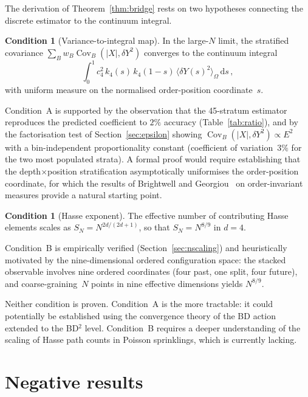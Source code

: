 \documentclass[12pt,a4paper]{article}
\theoremstyle{plain}
\theoremstyle{definition}
\newtheorem{condition}[theorem]{Condition}
\theoremstyle{remark}
\newcommand{\dd}{\mathrm{d}}
\newcommand{\Cov}{\operatorname{Cov}}
\begin{document}
The derivation of Theorem~\ref{thm:bridge} rests on two hypotheses
connecting the discrete estimator to the continuum integral.

\begin{condition}[Variance-to-integral map]
\label{cond:A}
In the large-$N$ limit, the stratified covariance
$\sum_B w_B \Cov_B(|X|, \delta Y^2)$ converges to the continuum
integral
\begin{equation}\label{eq:condA}
  \int_0^1 c_4^2\, k_4(s)\, k_4(1-s)\,
  \langle \delta Y(s)^2 \rangle_\Omega\, \dd s\,,
\end{equation}
with uniform measure on the normalised order-position
coordinate~$s$.
\end{condition}

Condition~A is supported by the observation that the 45-stratum
estimator reproduces the predicted coefficient to $2\%$ accuracy
(Table~\ref{tab:ratio}), and by the factorisation test of
Section~\ref{sec:epsilon} showing
$\Cov_B(|X|, \delta Y^2) \propto E^2$ with a bin-independent
proportionality constant (coefficient of variation~$3\%$ for the
two most populated strata).  A formal proof would require
establishing that the depth$\times$position stratification
asymptotically uniformises the order-position coordinate, for
which the results of Brightwell and
Georgiou~\cite{BrightwellLuczak:2011} on order-invariant measures
provide a natural starting point.

\begin{condition}[Hasse exponent]
\label{cond:B}
The effective number of contributing Hasse elements scales as
$S_N = N^{2d/(2d+1)}$, so that $S_N = N^{8/9}$ in $d = 4$.
\end{condition}

Condition~B is empirically verified (Section~\ref{sec:nscaling})
and heuristically motivated by the nine-dimensional ordered
configuration space: the stacked observable involves nine ordered
coordinates (four past, one split, four future), and
coarse-graining~$N$ points in nine effective dimensions yields
$N^{8/9}$.

Neither condition is proven.  Condition~A is the more tractable:
it could potentially be established using the convergence theory of
the BD action~\cite{BenincasaDowker:2010} extended to the BD${}^2$
level.  Condition~B requires a deeper understanding of the scaling
of Hasse path counts in Poisson sprinklings, which is currently
lacking.

\section{Negative results}
\label{sec:nogo}
\end{document}
